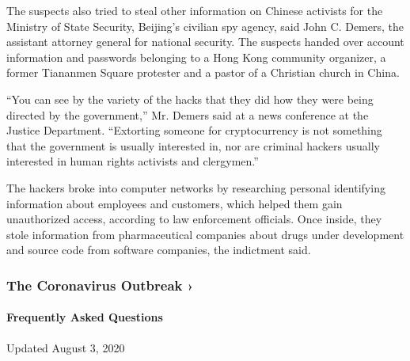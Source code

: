 The suspects also tried to steal other information on Chinese activists
for the Ministry of State Security, Beijing's civilian spy agency, said
John C. Demers, the assistant attorney general for national security.
The suspects handed over account information and passwords belonging to
a Hong Kong community organizer, a former Tiananmen Square protester and
a pastor of a Christian church in China.

``You can see by the variety of the hacks that they did how they were
being directed by the government,'' Mr. Demers said at a news conference
at the Justice Department. ``Extorting someone for cryptocurrency is not
something that the government is usually interested in, nor are criminal
hackers usually interested in human rights activists and clergymen.''

The hackers broke into computer networks by researching personal
identifying information about employees and customers, which helped them
gain unauthorized access, according to law enforcement officials. Once
inside, they stole information from pharmaceutical companies about drugs
under development and source code from software companies, the
indictment said.

\href{https://www.nytimes3xbfgragh.onion/news-event/coronavirus?action=click\&pgtype=Article\&state=default\&region=MAIN_CONTENT_3\&context=storylines_faq}{}

\hypertarget{the-coronavirus-outbreak-}{%
\subsubsection{The Coronavirus Outbreak
›}\label{the-coronavirus-outbreak-}}

\hypertarget{frequently-asked-questions}{%
\paragraph{Frequently Asked
Questions}\label{frequently-asked-questions}}

Updated August 3, 2020

